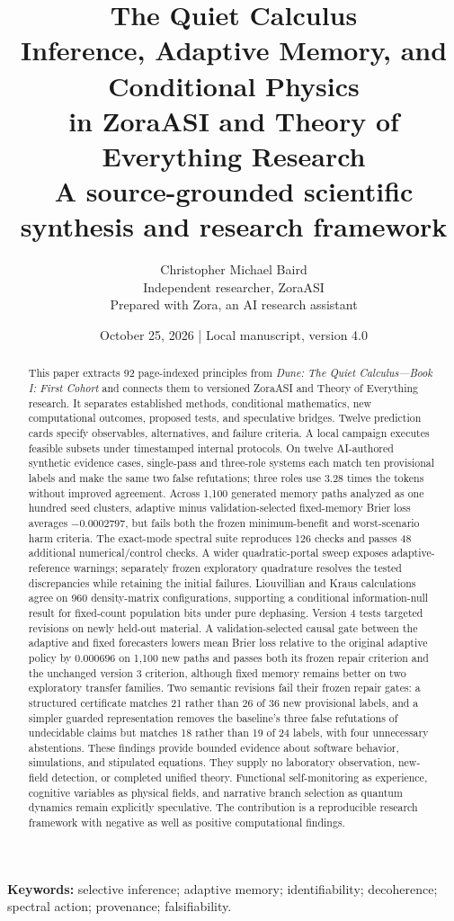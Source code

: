 \documentclass[11pt]{article}
\title{\textbf{The Quiet Calculus}\\[0.4em]\Large Inference, Adaptive Memory, and Conditional Physics\\in ZoraASI and Theory of Everything Research\\[0.5em]\large A source-grounded scientific synthesis and research framework}
\author{Christopher Michael Baird\\\small Independent researcher, ZoraASI\\\small Prepared with Zora, an AI research assistant}
\date{October 25, 2026 \quad | \quad Local manuscript, version 4.0}
\begin{document}
\maketitle
\begin{abstract}
\noindent This paper extracts 92 page-indexed principles from \emph{Dune: The Quiet Calculus---Book I: First Cohort} and connects them to versioned ZoraASI and Theory of Everything research. It separates established methods, conditional mathematics, new computational outcomes, proposed tests, and speculative bridges. Twelve prediction cards specify observables, alternatives, and failure criteria. A local campaign executes feasible subsets under timestamped internal protocols. On twelve AI-authored synthetic evidence cases, single-pass and three-role systems each match ten provisional labels and make the same two false refutations; three roles use 3.28 times the tokens without improved agreement. Across 1,100 generated memory paths analyzed as one hundred seed clusters, adaptive minus validation-selected fixed-memory Brier loss averages $-0.0002797$, but fails both the frozen minimum-benefit and worst-scenario harm criteria. The exact-mode spectral suite reproduces 126 checks and passes 48 additional numerical/control checks. A wider quadratic-portal sweep exposes adaptive-reference warnings; separately frozen exploratory quadrature resolves the tested discrepancies while retaining the initial failures. Liouvillian and Kraus calculations agree on 960 density-matrix configurations, supporting a conditional information-null result for fixed-count population bits under pure dephasing. Version 4 tests targeted revisions on newly held-out material. A validation-selected causal gate between the adaptive and fixed forecasters lowers mean Brier loss relative to the original adaptive policy by $0.000696$ on 1,100 new paths and passes both its frozen repair criterion and the unchanged version 3 criterion, although fixed memory remains better on two exploratory transfer families. Two semantic revisions fail their frozen repair gates: a structured certificate matches 21 rather than 26 of 36 new provisional labels, and a simpler guarded representation removes the baseline's three false refutations of undecidable claims but matches 18 rather than 19 of 24 labels, with four unnecessary abstentions. These findings provide bounded evidence about software behavior, simulations, and stipulated equations. They supply no laboratory observation, new-field detection, or completed unified theory. Functional self-monitoring as experience, cognitive variables as physical fields, and narrative branch selection as quantum dynamics remain explicitly speculative. The contribution is a reproducible research framework with negative as well as positive computational findings.
\end{abstract}
\noindent\textbf{Keywords:} selective inference; adaptive memory; identifiability; decoherence; spectral action; provenance; falsifiability.
\end{document}
